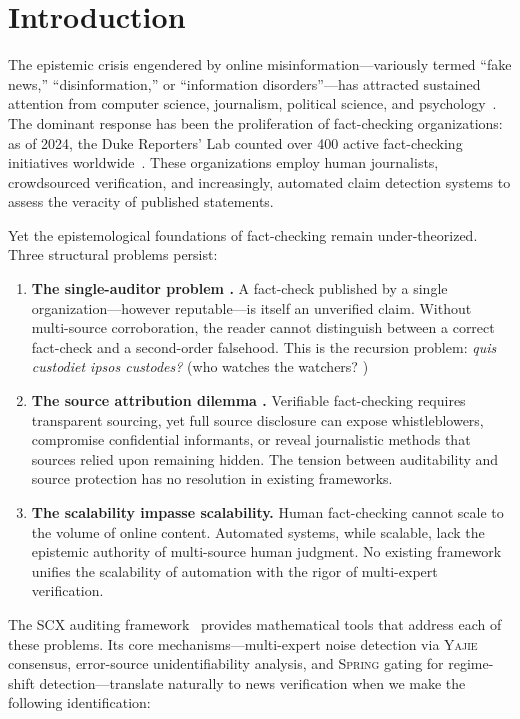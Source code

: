 \documentclass[11pt,a4paper]{article}
\theoremstyle{definition}
\newcommand{\Yajie}{\textsc{Yajie}}
\newcommand{\Spring}{\textsc{Spring}}
\newcommand{\SCX}{\textsc{SCX}}
\begin{document}
\section{Introduction }

The epistemic crisis engendered by online misinformation---variously termed ``fake news,'' ``disinformation,'' or ``information disorders''---has attracted sustained attention from computer science, journalism, political science, and psychology~\cite{lazer2018, vosoughi2018, pennycook2020}. The dominant response has been the proliferation of fact-checking organizations: as of 2024, the Duke Reporters' Lab counted over 400 active fact-checking initiatives worldwide~\cite{stencel2024}. These organizations employ human journalists, crowdsourced verification, and increasingly, automated claim detection systems to assess the veracity of published statements.

Yet the epistemological foundations of fact-checking remain under-theorized. Three structural problems persist:

\begin{enumerate}[label=(\roman*)]
    \item \textbf{The single-auditor problem .} A fact-check published by a single organization---however reputable---is itself an unverified claim. Without multi-source corroboration, the reader cannot distinguish between a correct fact-check and a second-order falsehood. This is the recursion problem: \textit{quis custodiet ipsos custodes?} (who watches the watchers? )
    \item \textbf{The source attribution dilemma .} Verifiable fact-checking requires transparent sourcing, yet full source disclosure can expose whistleblowers, compromise confidential informants, or reveal journalistic methods that sources relied upon remaining hidden. The tension between auditability and source protection has no resolution in existing frameworks.
    \item \textbf{The scalability impasse scalability.} Human fact-checking cannot scale to the volume of online content. Automated systems, while scalable, lack the epistemic authority of multi-source human judgment. No existing framework unifies the scalability of automation with the rigor of multi-expert verification.
\end{enumerate}

The \SCX{} auditing framework~\cite{SCX2025} provides mathematical tools that address each of these problems. Its core mechanisms---multi-expert noise detection via \Yajie{} consensus, error-source unidentifiability analysis, and \Spring{} gating for regime-shift detection---translate naturally to news verification when we make the following identification:
\end{document}
